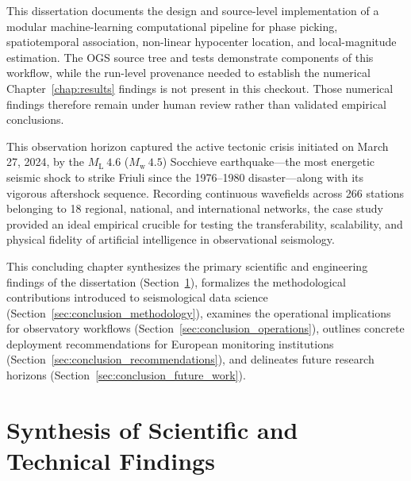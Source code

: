 
\label{chap:conclusion}

This dissertation documents the design and source-level implementation of a modular machine-learning computational pipeline for phase picking, spatiotemporal association, non-linear hypocenter location, and local-magnitude estimation. The OGS source tree and tests demonstrate components of this workflow, while the run-level provenance needed to establish the numerical Chapter~\ref{chap:results} findings is not present in this checkout. Those numerical findings therefore remain under human review rather than validated empirical conclusions.

This observation horizon captured the active tectonic crisis initiated on March 27, 2024, by the $M_{\mathrm{L}}~4.6$ ($M_{\mathrm{w}}~4.5$) Socchieve earthquake---the most energetic seismic shock to strike Friuli since the 1976--1980 disaster---along with its vigorous aftershock sequence. Recording continuous wavefields across 266 stations belonging to 18 regional, national, and international networks, the case study provided an ideal empirical crucible for testing the transferability, scalability, and physical fidelity of artificial intelligence in observational seismology.

This concluding chapter synthesizes the primary scientific and engineering findings of the dissertation (Section~\ref{sec:conclusion_findings}), formalizes the methodological contributions introduced to seismological data science (Section~\ref{sec:conclusion_methodology}), examines the operational implications for observatory workflows (Section~\ref{sec:conclusion_operations}), outlines concrete deployment recommendations for European monitoring institutions (Section~\ref{sec:conclusion_recommendations}), and delineates future research horizons (Section~\ref{sec:conclusion_future_work}).

\section{Synthesis of Scientific and Technical Findings}
\label{sec:conclusion_findings}

